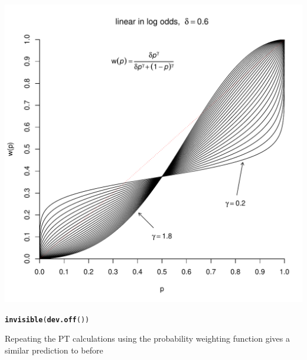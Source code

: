 \documentclass{article}\usepackage[]{graphicx}\usepackage[]{color}
\makeatletter
\def\maxwidth{ %
  \ifdim\Gin@nat@width>\linewidth
    \linewidth
  \else
    \Gin@nat@width
  \fi
}
\newcommand{\hlstd}[1]{\textcolor[rgb]{0.345,0.345,0.345}{#1}}%
\newcommand{\hlkwd}[1]{\textcolor[rgb]{0.737,0.353,0.396}{\textbf{#1}}}%
\newenvironment{kframe}{%
 \def\at@end@of@kframe{}%
 \ifinner\ifhmode%
  \def\at@end@of@kframe{\end{minipage}}%
  \begin{minipage}{\columnwidth}%
 \fi\fi%
 \def\FrameCommand##1{\hskip\@totalleftmargin \hskip-\fboxsep
 \colorbox{shadecolor}{##1}\hskip-\fboxsep
     \hskip-\linewidth \hskip-\@totalleftmargin \hskip\columnwidth}%
 \MakeFramed {\advance\hsize-\width
   \@totalleftmargin\z@ \linewidth\hsize
   \@setminipage}}%
 {\par\unskip\endMakeFramed%
 \at@end@of@kframe}
\newenvironment{knitrout}{}{} %
\makeatother
\begin{document}
\begin{knitrout}
{\centering \includegraphics[width=\maxwidth]{figure/unnamed-chunk-22} 

}


\begin{kframe}\begin{alltt}
\hlkwd{invisible}\hlstd{(}\hlkwd{dev.off}\hlstd{())}
\end{alltt}
\end{kframe}
\end{knitrout}


Repeating the PT calculations using the \cite{Gonzalez_Wu_1999} probability weighting function gives a similar prediction to before
\end{document}
